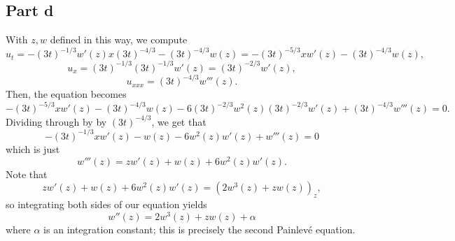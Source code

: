 \documentclass{article}
\begin{document}
\subsection{Part d}
With $z,w$ defined in this way, we compute
\[
u_t=-(3t)^{-1/3}w'(z)x(3t)^{-4/3}-(3t)^{-4/3}w(z)=-(3t)^{-5/3}xw'(z)-(3t)^{-4/3}w(z),
\]
\[
u_x=(3t)^{-1/3}(3t)^{-1/3}w'(z)=(3t)^{-2/3}w'(z),
\]
\[
u_{xxx}=(3t)^{-4/3}w'''(z).
\]
Then, the equation becomes
\[
-(3t)^{-5/3}xw'(z)-(3t)^{-4/3}w(z)-6(3t)^{-2/3}w^2(z)(3t)^{-2/3}w'(z)+(3t)^{-4/3}w'''(z)=0.
\]
Dividing through by by $(3t)^{-4/3}$, we get that
\[
-(3t)^{-1/3}xw'(z)-w(z)-6w^2(z)w'(z)+w'''(z)=0
\]
which is just
\[
w'''(z)=zw'(z)+w(z)+6w^2(z)w'(z).
\]
Note that 
\[
zw'(z)+w(z)+6w^2(z)w'(z)=(2w^3(z)+zw(z))_z,
\]
so integrating both sides of our equation yields
\[
w''(z)=2w^3(z)+zw(z)+\alpha
\]
where $\alpha$ is an integration constant; this is precisely the second Painlev\'e equation.
\end{document}
